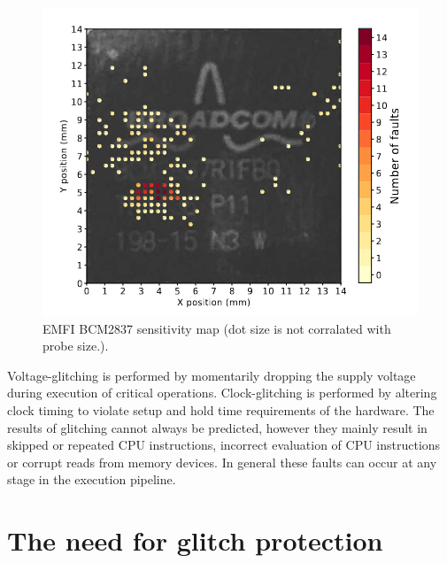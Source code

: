 \begin{figure}[h!]
    \centering
    \includegraphics[scale=0.5]{docs/images/emfi_error_map.png}
    \caption{EMFI BCM2837 sensitivity map (dot size is not corralated with probe size.)\cite{emfi_injection}.}
    \label{fig:emfi_map}
\end{figure}

Voltage-glitching is performed by momentarily dropping the supply voltage during execution of critical operations. Clock-glitching is performed by altering clock timing to violate setup and hold time requirements of the hardware\cite{intro_to_FI}. The results of glitching cannot always be predicted, however they mainly result in skipped or repeated CPU instructions, incorrect evaluation of CPU instructions or corrupt reads from memory devices\cite{intro_to_FI}. In general these faults can occur at any stage in the execution pipeline. 


\section{The need for glitch protection}

